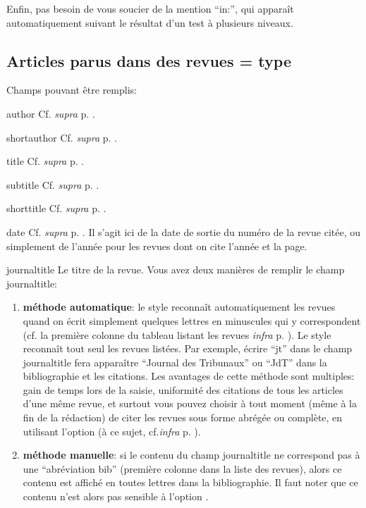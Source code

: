 \documentclass[a4paper]{ltxdockit}[2011/03/25]
\newcommand{\supra}{\emph{supra}\xspace}
\newcommand{\infra}{\emph{infra}\xspace}
\newcommand{\Cf}{\textnormal{Cf. }}
\newcommand{\cf}{cf.\xspace}
\newcommand{\GM}{\enquote}
\newcommand{\Pex}{\textnormal{Par exemple}\xspace}
\begin{document}
Enfin, pas besoin de vous soucier de la mention \GM{in:}, qui apparaît automatiquement suivant le résultat d'un test à plusieurs niveaux.

\subsection{Articles parus dans des revues = type }

Champs pouvant être remplis:
\begin{marglist}
\item[author] \Cf \supra p. \pageref{author}. 
\item[shortauthor] \Cf \supra p. \pageref{shortauthor}. 
\item[title] \Cf \supra p. \pageref{title}. 
\item[subtitle] \Cf \supra p. \pageref{subtitle}. 
\item[shorttitle] \Cf \supra p. \pageref{shorttitle}. 
\item[date] \Cf \supra p. \pageref{date}. Il s'agit ici de la date de sortie du numéro de la revue citée, ou simplement de l'année pour les revues dont on cite l'année et la page.
\item[journaltitle]\label{journaltitle}Le titre de la revue. Vous avez deux manières de remplir le champ journaltitle:
\begin{enumerate}
\item \textbf{méthode automatique}: le style reconnaît automatiquement les revues quand on écrit simplement quelques lettres en minuscules qui y correspondent (\cf la première colonne du tableau listant les revues \infra p. \pageref{listerevues}). Le style reconnaît tout seul les revues listées. \Pex, écrire \GM{jt} dans le champ journaltitle fera apparaître \GM{Journal des Tribunaux} ou \GM{JdT} dans la bibliographie et les citations.
Les avantages de cette méthode sont multiples: gain de temps lors de la saisie, uniformité des citations de tous les articles d'une même revue, et surtout vous pouvez choisir à tout moment (même à la fin de la rédaction) de citer les revues sous forme abrégée ou complète, en utilisant l'option  (à ce sujet, \cf \infra p. \pageref{abrjournal}). 
\item \textbf{méthode manuelle}: si le contenu du champ journaltitle ne correspond pas à une \GM{abréviation bib} (première colonne dans la liste des revues), alors ce contenu est affiché en toutes lettres dans la bibliographie. Il faut noter que ce contenu n'est alors pas sensible à l'option .

\end{enumerate}
\end{marglist}
\end{document}
